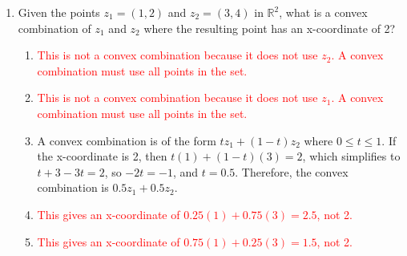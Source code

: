 \documentclass{article}%
\newcommand{\incorrect}[1]{\textcolor{red}{#1}}
\begin{document}
\begin{enumerate}
\begin{enumerate}
\item \incorrect{A convex set can have curved boundaries.  For example, a circle is a convex set, but its boundary is a curve. The feasible region can have curved boundaries in non-linear programming problems, but in linear programming, the boundaries are straight lines.}%
\item \incorrect{A convex set is not necessarily connected.  A disconnected set can still be convex if each of its connected components is convex.  The feasible region in linear programming is always a connected set.}%
\item \incorrect{A convex set does contain its boundary, but this is not the defining characteristic of a convex set. The defining characteristic is that the line segment between any two points in the set is also in the set.}%
\end{enumerate}%
\vspace{1em}%
\item Given the points $z_1 = (1, 2)$ and $z_2 = (3, 4)$ in $\mathbb{R}^2$, what is a convex combination of $z_1$ and $z_2$ where the resulting point has an x-coordinate of 2?%
\begin{enumerate}%
\item \incorrect{This is not a convex combination because it does not use $z_2$.  A convex combination must use all points in the set.}%
\item \incorrect{This is not a convex combination because it does not use $z_1$. A convex combination must use all points in the set.}%
\item A convex combination is of the form $tz_1 + (1-t)z_2$ where $0 \le t \le 1$.  If the x-coordinate is 2, then $t(1) + (1-t)(3) = 2$, which simplifies to $t + 3 - 3t = 2$, so $-2t = -1$, and $t = 0.5$. Therefore, the convex combination is $0.5z_1 + 0.5z_2$.%
\item \incorrect{This gives an x-coordinate of $0.25(1) + 0.75(3) = 2.5$, not 2.}%
\item \incorrect{This gives an x-coordinate of $0.75(1) + 0.25(3) = 1.5$, not 2.}%
\end{enumerate}%
\vspace{1em}%
\end{enumerate}

%
\end{document}
